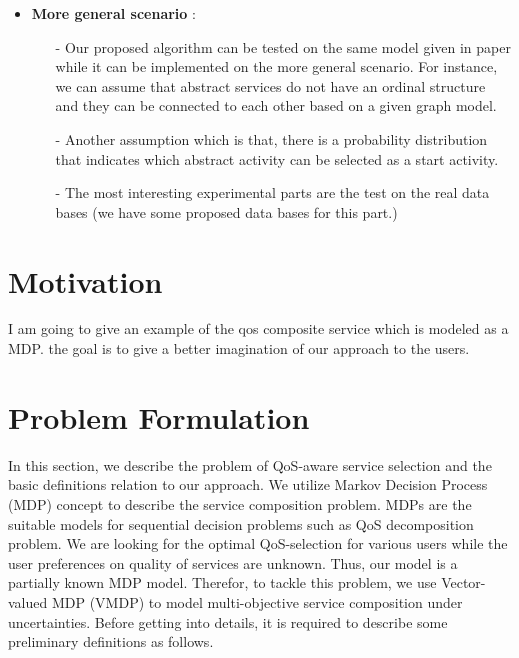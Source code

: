 \documentclass[10pt,journal,compsoc]{IEEEtran}
\begin{document}
\begin{itemize}
\item \textbf{More general scenario} : \\
\begin{itemize}

\item[-] Our proposed algorithm can be tested on the same model given in paper \cite{DBLP:journals/tase/KhanoucheACKY16} while it can be implemented on the more general scenario. For instance, we can assume that abstract services do not have an ordinal structure and they can be connected to each other based on a given graph model. 

\item[-] Another assumption which is that, there is a probability distribution that indicates which abstract activity can be selected as a start activity. 

\item[-] The most interesting experimental parts are the test on the real data bases ({\color{red}we have some proposed data bases for this part.}) 

\end{itemize}
\end{itemize}

\section{Motivation}
I am going to give an example of the qos composite service which is modeled as a MDP. the goal is to give a better imagination of our approach to the users. 

\section{Problem Formulation}

In this section, we describe the problem of QoS-aware service selection and the basic definitions relation to our approach.
 We utilize Markov Decision Process (MDP) concept to describe the service composition problem. MDPs are the suitable models for sequential decision problems such as QoS decomposition problem. We are looking for the optimal QoS-selection for various users while the user preferences on quality of services are unknown. Thus, our model is a partially known MDP model. Therefor, to tackle this problem, we use Vector-valued MDP (VMDP) to model multi-objective service composition under uncertainties. Before getting into details, it is required to describe some preliminary definitions as follows. 
\end{document}

